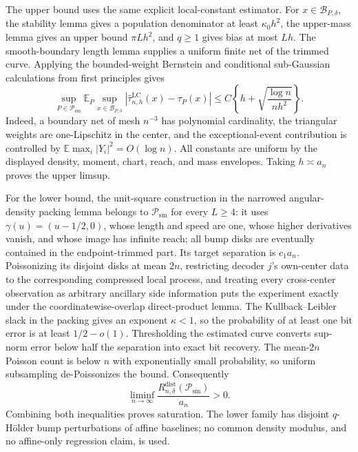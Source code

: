 The upper bound uses the same explicit local-constant estimator.  For \(x\in\mathcal B_{P,\delta}\), the stability lemma gives a population denominator at least \(\kappa_0h^2\), the upper-mass lemma gives an upper bound \(\pi Lh^2\), and \(q\geq1\) gives bias at most \(Lh\).  The smooth-boundary length lemma supplies a uniform finite net of the trimmed curve.  Applying the bounded-weight Bernstein and conditional sub-Gaussian calculations from first principles gives
\[
\sup_{P\in\mathcal P_{\mathrm{sm}}}
\mathbb E_P\sup_{x\in\mathcal B_{P,\delta}}
|\widehat\tau^{\mathrm{LC}}_{n,h}(x)-\tau_P(x)|
\leq C\left\{h+\sqrt{\frac{\log n}{nh^2}}\right\}.
\]
Indeed, a boundary net of mesh \(n^{-3}\) has polynomial cardinality, the triangular weights are one-Lipschitz in the center, and the exceptional-event contribution is controlled by \(\mathbb E\max_i|Y_i|^2=O(\log n)\).  All constants are uniform by the displayed density, moment, chart, reach, and mass envelopes.  Taking \(h\asymp a_n\) proves the upper limsup.

For the lower bound, the unit-square construction in the narrowed angular-density packing lemma belongs to \(\mathcal P_{\mathrm{sm}}\) for every \(L\geq4\): it uses \(\gamma(u)=(u-1/2,0)\), whose length and speed are one, whose higher derivatives vanish, and whose image has infinite reach; all bump disks are eventually contained in the endpoint-trimmed part.  Its target separation is \(c_1a_n\).  Poissonizing its disjoint disks at mean \(2n\), restricting decoder \(j\)'s own-center data to the corresponding compressed local process, and treating every cross-center observation as arbitrary ancillary side information puts the experiment exactly under the coordinatewise-overlap direct-product lemma.  The Kullback--Leibler slack in the packing gives an exponent \(\kappa<1\), so the probability of at least one bit error is at least \(1/2-o(1)\).  Thresholding the estimated curve converts sup-norm error below half the separation into exact bit recovery.  The mean-\(2n\) Poisson count is below \(n\) with exponentially small probability, so uniform subsampling de-Poissonizes the bound.  Consequently
\[
\liminf_{n\to\infty}
\frac{R_{n,\delta}^{\mathrm{dist}}(\mathcal P_{\mathrm{sm}})}{a_n}>0.
\]
Combining both inequalities proves saturation.  The lower family has disjoint \(q\)-H\"older bump perturbations of affine baselines; no common density modulus, and no affine-only regression claim, is used.